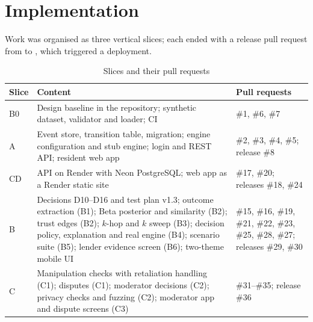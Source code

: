 \section{Implementation}\label{sec:implementation}
Work was organised as three vertical slices; each ended with a release pull request from  to , which triggered a deployment.

\begin{table}[!htbp]
\centering
\small
\caption{Slices and their pull requests}\label{tab:slices-their-pull-requests}
\begin{tabular}{@{}L{47pt}L{230pt}L{98pt}@{}}
\toprule
Slice & Content & Pull requests \\
\midrule
B0 & Design baseline in the repository; synthetic dataset, validator and loader; CI & \#1, \#6, \#7 \\
A & Event store, transition table, migration; engine configuration and stub engine; login and REST API; resident web app & \#2, \#3, \#4, \#5; release \#8 \\
CD & API on Render with Neon PostgreSQL; web app as a Render static site & \#17, \#20; releases \#18, \#24 \\
B & Decisions D10--D16 and test plan v1.3; outcome extraction (B1); Beta posterior and similarity (B2); trust edges (B2); $k$-hop and $k$ sweep (B3); decision policy, explanation and real engine (B4); scenario suite (B5); lender evidence screen (B6); two-theme mobile UI & \#15, \#16, \#19, \#21, \#22, \#23, \#25, \#28, \#27; releases \#29, \#30 \\
C & Manipulation checks with retaliation handling (C1); disputes (C1); moderator decisions (C2); privacy checks and fuzzing (C2); moderator app and dispute screens (C3) & \#31--\#35; release \#36 \\
\bottomrule
\end{tabular}
\end{table}
